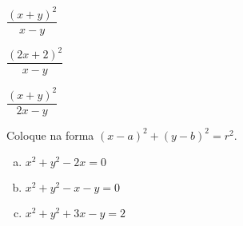\begin{secExercicios}
\begin{exer}
\begin{enumerate}[a)]
\begin{multicols}{2}
        \item $\dfrac{(x+y)^2}{x-y}$
        
       \item $\dfrac{(2x+2)^2}{x-y}$
        
        \item $\dfrac{(x+y)^2}{2x-y}$
  \end{multicols}\end{enumerate}
\end{exer}

\begin{exer}
    Coloque na forma $(x-a)^2+(y-b)^2=r^2$.
    \begin{enumerate}[a)]
        \item $x^2+y^2-2x=0$
        \item $x^2+y^2-x-y=0$
        \item $x^2+y^2+3x-y=2$
    \end{enumerate}
    \end{exer}

  
  
  
  
  
  
  
  
  

\end{secExercicios}
